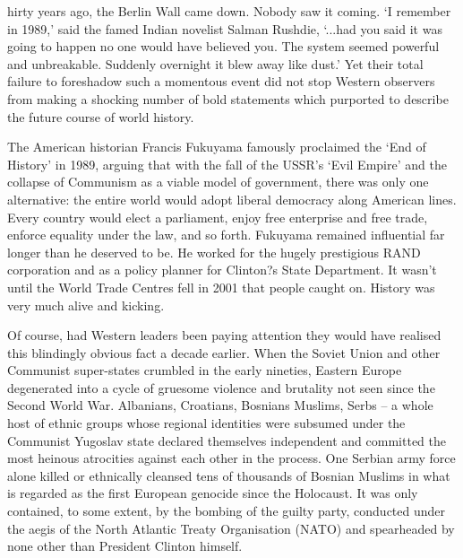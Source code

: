 \label{ch:suddenly-it-blew-away-like-dust}

{\flushright{}}
\smallskip

hirty years ago, the Berlin Wall came down. Nobody saw it coming. `I
   remember in 1989,' said the famed Indian novelist Salman Rushdie,
   `...had you said it was going to happen no one would have believed you.
   The system seemed powerful and unbreakable. Suddenly overnight it blew
   away like dust.' Yet their total failure to foreshadow such a momentous
   event did not stop Western observers from making a shocking number of
   bold statements which purported to describe the future course of world
   history.

   The American historian Francis Fukuyama famously proclaimed the `End of
   History' in 1989, arguing that with the fall of the USSR's `Evil
   Empire' and the collapse of Communism as a viable model of government,
   there was only one alternative: the entire world would adopt liberal
   democracy along American lines. Every country would elect a parliament,
   enjoy free enterprise and free trade, enforce equality under the law,
   and so forth. Fukuyama remained influential far longer than he deserved
   to be. He worked for the hugely prestigious RAND corporation and as a
   policy planner for Clinton?s State Department. It wasn't until the
   World Trade Centres fell in 2001 that people caught on. History was
   very much alive and kicking.

   Of course, had Western leaders been paying attention they would have
   realised this blindingly obvious fact a decade earlier. When the Soviet
   Union and other Communist super-states crumbled in the early nineties,
   Eastern Europe degenerated into a cycle of gruesome violence and
   brutality not seen since the Second World War. Albanians, Croatians,
   Bosnians Muslims, Serbs -- a whole host of ethnic groups whose regional
   identities were subsumed under the Communist Yugoslav state declared
   themselves independent and committed the most heinous atrocities
   against each other in the process. One Serbian army force alone killed
   or ethnically cleansed tens of thousands of Bosnian Muslims in what is
   regarded as the first European genocide since the Holocaust. It was
   only contained, to some extent, by the bombing of the guilty party,
   conducted under the aegis of the North Atlantic Treaty Organisation
   (NATO) and spearheaded by none other than President Clinton himself.

